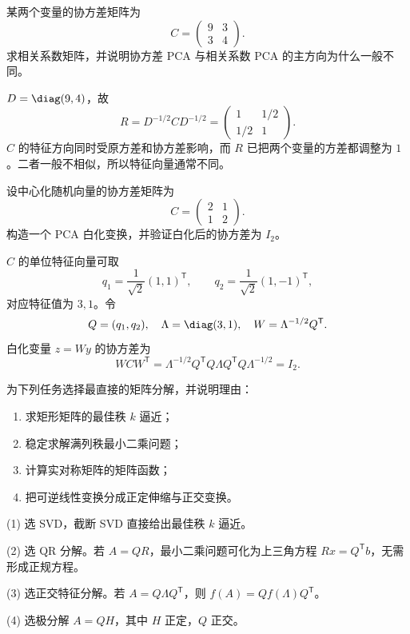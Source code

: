 \begin{exercise}[level=advanced]
某两个变量的协方差矩阵为
\[
C=\begin{pmatrix}9&3\\3&4\end{pmatrix}.
\]
求相关系数矩阵，并说明协方差 PCA 与相关系数 PCA 的主方向为什么一般不同。
\begin{solution}
$D=\diag(9,4)$，故
\[
R=D^{-1/2}CD^{-1/2}
=\begin{pmatrix}1&1/2\\1/2&1\end{pmatrix}.
\]
$C$ 的特征方向同时受原方差和协方差影响，而 $R$ 已把两个变量的方差都调整为 $1$。二者一般不相似，所以特征向量通常不同。
\end{solution}
\end{exercise}

\begin{exercise}[level=advanced]
设中心化随机向量的协方差矩阵为
\[
C=\begin{pmatrix}2&1\\1&2\end{pmatrix}.
\]
构造一个 PCA 白化变换，并验证白化后的协方差为 $I_2$。
\begin{solution}
$C$ 的单位特征向量可取
\[
q_1=\frac1{\sqrt2}(1,1)^{\mathsf T},
\qquad
q_2=\frac1{\sqrt2}(1,-1)^{\mathsf T},
\]
对应特征值为 $3,1$。令
\[
Q=(q_1,q_2),\quad \Lambda=\diag(3,1),
\quad W=\Lambda^{-1/2}Q^{\mathsf T}.
\]
白化变量 $z=Wy$ 的协方差为
\[
WCW^{\mathsf T}
=\Lambda^{-1/2}Q^{\mathsf T}Q\Lambda Q^{\mathsf T}Q\Lambda^{-1/2}
=I_2.
\]
\end{solution}
\end{exercise}

\begin{exercise}[level=advanced]
为下列任务选择最直接的矩阵分解，并说明理由：
\begin{enumerate}[label=(\arabic*)]
\item 求矩形矩阵的最佳秩 $k$ 逼近；
\item 稳定求解满列秩最小二乘问题；
\item 计算实对称矩阵的矩阵函数；
\item 把可逆线性变换分成正定伸缩与正交变换。
\end{enumerate}
\begin{solution}
(1) 选 SVD，截断 SVD 直接给出最佳秩 $k$ 逼近。

(2) 选 QR 分解。若 $A=QR$，最小二乘问题可化为上三角方程 $Rx=Q^{\mathsf T}b$，无需形成正规方程。

(3) 选正交特征分解。若 $A=Q\Lambda Q^{\mathsf T}$，则 $f(A)=Qf(\Lambda)Q^{\mathsf T}$。

(4) 选极分解 $A=QH$，其中 $H$ 正定，$Q$ 正交。
\end{solution}
\end{exercise}

